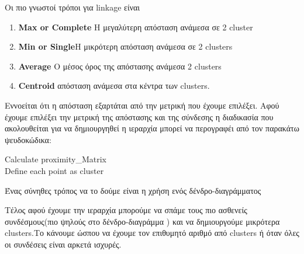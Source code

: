 Οι πιο γνωστοί τρόποι για linkage είναι 
\begin{enumerate}
\item \textbf{Max or Complete }Η μεγαλύτερη απόσταση ανάμεσα σε 2 cluster
\item \textbf{Min or Single}H μικρότερη απόσταση ανάμεσα σε 2 clusters 
\item \textbf{Average }Ο μέσος όρος της απόστασης  ανάμεσα 2 clusters 
\item \textbf{Centroid } απόσταση ανάμεσα στα κέντρα των clusters.
\end{enumerate}
Εννοείται ότι η απόσταση εξαρτάται από την μετρική που έχουμε επιλέξει.
 Αφού έχουμε επιλέξει την μετρική της απόστασης και της σύνδεσης η διαδικασία που ακολουθείται για να δημιουργηθεί η ιεραρχία μπορεί να περογραφέι από τον παρακάτω ψευδοκώδικα:
 
\begin{algorithm}[H]
Calculate proximity\_Matrix\\
Define each point as cluster\\
\end{algorithm}

\begin{minipage}{\linewidth}%
Ένας σύνηθες τρόπος να το δούμε είναι η  χρήση ενός δένδρο-διαγράμματος
\label{fig:dentro1}%
\end{minipage}
 
Τέλος αφού έχουμε την ιεραρχία μπορούμε να σπάμε τους πιο ασθενείς συνδέσμους(πιο ψηλούς στο δένδρο-διαγράμμα ) και να δημιουργούμε μικρότερα clusters.Το κάνουμε ώσπου να έχουμε τον επιθυμητό αριθμό από clusters
ή όταν όλες οι συνδέσεις είναι αρκετά ισχυρές.


